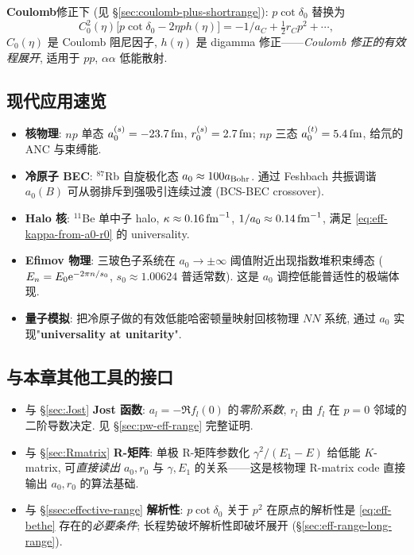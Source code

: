 \textbf{Coulomb}修正下 (见 \S\ref{sec:coulomb-plus-shortrange}): $p\cot\delta_0$ 替换为
\begin{equation}
  C_0^2(\eta)\bigl[p\cot\delta_0-2\eta p h(\eta)\bigr]=-1/a_C+\tfrac{1}{2}r_C p^2+\cdots,
\end{equation}
$C_0(\eta)$ 是 Coulomb 阻尼因子, $h(\eta)$ 是 digamma 修正——\emph{Coulomb 修正的有效程展开}, 适用于 $pp$, $\alpha\alpha$ 低能散射.

\subsection{现代应用速览}\label{sec:eff-range-modern}

\begin{itemize}
  \item \textbf{核物理}: $np$ 单态 $a_0^{(s)}=-23.7\,{\rm fm}$, $r_0^{(s)}=2.7\,{\rm fm}$; $np$ 三态 $a_0^{(t)}=5.4\,{\rm fm}$, 给氘的 ANC 与束缚能.
  \item \textbf{冷原子 BEC}: $^{87}$Rb 自旋极化态 $a_0\approx 100 a_{\rm Bohr}$. 通过 Feshbach 共振调谐 $a_0(B)$ 可从弱排斥到强吸引连续过渡 (BCS-BEC crossover).
  \item \textbf{Halo 核}: $^{11}$Be 单中子 halo, $\kappa\approx 0.16\,{\rm fm}^{-1}$, $1/a_0\approx 0.14\,{\rm fm}^{-1}$, 满足 \eqref{eq:eff-kappa-from-a0-r0} 的 universality.
  \item \textbf{Efimov 物理}: 三玻色子系统在 $a_0\to\pm\infty$ 阈值附近出现指数堆积束缚态 ($E_n=E_0\mathrm{e}^{-2\pi n/s_0}$, $s_0\approx 1.00624$ 普适常数). 这是 $a_0$ 调控低能普适性的极端体现.
  \item \textbf{量子模拟}: 把冷原子做的有效低能哈密顿量映射回核物理 $NN$ 系统, 通过 $a_0$ 实现"\textbf{universality at unitarity}".
\end{itemize}

\subsection{与本章其他工具的接口}\label{sec:eff-range-interface}

\begin{itemize}
  \item 与 \S\ref{sec:Jost} \textbf{Jost 函数}: $a_l=-\Re f_l(0)$ 的\emph{零阶系数}, $r_l$ 由 $f_l$ 在 $p=0$ 邻域的二阶导数决定. 见 \S\ref{sec:pw-eff-range} 完整证明.
  \item 与 \S\ref{sec:Rmatrix} \textbf{R-矩阵}: 单极 R-矩阵参数化 $\gamma^2/(E_1-E)$ 给低能 $K$-matrix, 可\emph{直接读出} $a_0, r_0$ 与 $\gamma, E_1$ 的关系——这是核物理 R-matrix code 直接输出 $a_0, r_0$ 的算法基础.
  \item 与 \S\ref{ssec:effective-range} \textbf{解析性}: $p\cot\delta_0$ 关于 $p^2$ 在原点的解析性是 \eqref{eq:eff-bethe} 存在的\emph{必要条件}; 长程势破坏解析性即破坏展开 (\S\ref{sec:eff-range-long-range}).
\end{itemize}

